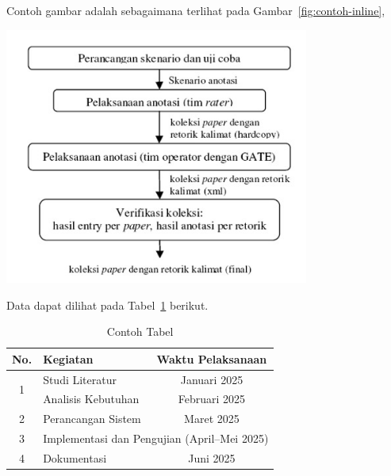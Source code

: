 Contoh gambar adalah sebagaimana terlihat pada Gambar~\ref{fig:contoh-inline}, 

\begin{center}
    \includegraphics[width=10cm]{images/example.jpg}
    \label{fig:contoh-inline}
\end{center}



Data dapat dilihat pada Tabel~\ref{tab:contoh-merge} berikut.

\begin{table}[!htbp]
    \centering
    \DefaultTableFormatting                
    \caption{Contoh Tabel}
    \begin{tabularx}{\textwidth}{|c|X|c|}
        \hline
        \rowcolor[HTML]{EFEFEF}
        \textbf{No.} & \textbf{Kegiatan} & \textbf{Waktu Pelaksanaan} \\
        \hline

        \multirow{2}{*}{1} & Studi Literatur & Januari 2025 \\
        \cline{2-3}
        & Analisis Kebutuhan & Februari 2025 \\
        \hline

        2 & Perancangan Sistem & Maret 2025 \\
        \hline

        3 & \multicolumn{2}{c|}{Implementasi dan Pengujian (April–Mei 2025)} \\
        \hline

        4 & Dokumentasi & Juni 2025 \\
        \hline
    \end{tabularx}
    \label{tab:contoh-merge}
\end{table}
